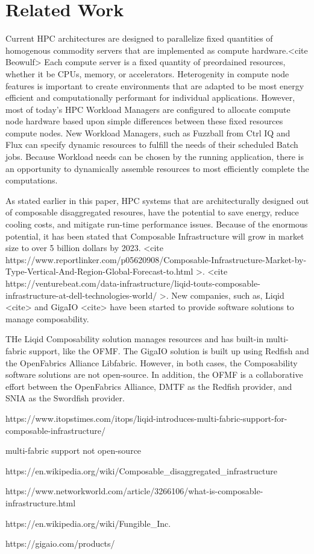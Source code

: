 \section{Related Work}
Current HPC architectures are designed to parallelize fixed quantities of homogenous commodity servers that are implemented as compute hardware.<cite Beowulf>  Each compute server is a fixed quantity of preordained resources, whether it be CPUs, memory, or accelerators.  Heterogenity in compute node features is important to create environments that are adapted to be most energy efficient and computationally performant for individual applications.  However, most of today's HPC Workload Managers are configured to allocate compute node hardware based upon simple differences between these fixed resources compute nodes.  New Workload Managers, such as Fuzzball from Ctrl IQ \cite{fuzzball} and Flux \cite{flux} can specify dynamic resources to fulfill the needs of their scheduled Batch jobs.  Because Workload needs can be chosen by the running application, there is an opportunity to dynamically assemble resources to most efficiently complete the computations.
 
As stated earlier in this paper, HPC systems that are architecturally designed out of composable disaggregated resoures, have the potential to save energy, reduce cooling costs, and mitigate run-time performance issues.  Because of the enormous potential, it has been stated that Composable Infrastructure will grow in market size to over 5 billion dollars by 2023. <cite https://www.reportlinker.com/p05620908/Composable-Infrastructure-Market-by-Type-Vertical-And-Region-Global-Forecast-to.html >. <cite https://venturebeat.com/data-infrastructure/liqid-touts-composable-infrastructure-at-dell-technologies-world/ >. New companies, such as, Liqid <cite> and GigaIO <cite> have been started to provide software solutions to manage composability.  

THe Liqid Composability solution manages resources and has built-in multi-fabric support, like the OFMF.  The GigaIO solution is built up using Redfish and the OpenFabrics Alliance Libfabric.  However, in both cases, the Composability software solutions are not open-source.  In addition, the OFMF is a collaborative effort between the OpenFabrics Alliance, DMTF as the Redfish provider, and SNIA as the Swordfish provider.

https://www.itopstimes.com/itops/liqid-introduces-multi-fabric-support-for-composable-infrastructure/

multi-fabric support not open-source

https://en.wikipedia.org/wiki/Composable_disaggregated_infrastructure

https://www.networkworld.com/article/3266106/what-is-composable-infrastructure.html

https://en.wikipedia.org/wiki/Fungible_Inc.

https://gigaio.com/products/




 
